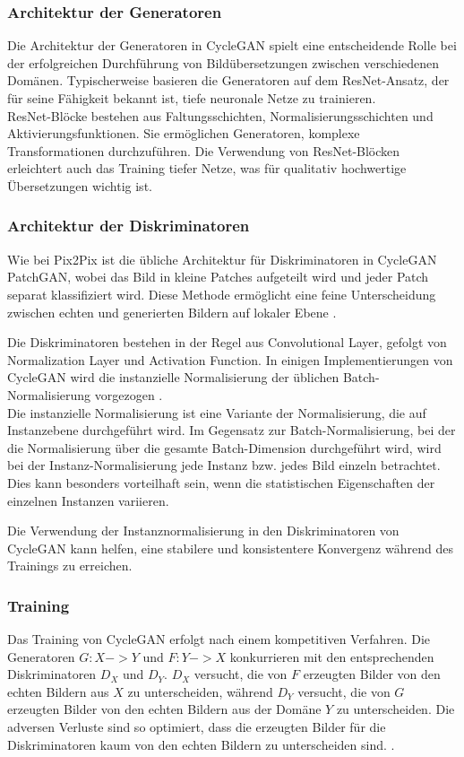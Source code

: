 \subsubsection{Architektur der Generatoren}
Die Architektur der Generatoren in CycleGAN spielt eine entscheidende Rolle bei der erfolgreichen Durchführung von Bildübersetzungen zwischen verschiedenen Domänen. Typischerweise basieren die Generatoren auf dem ResNet-Ansatz, der für seine Fähigkeit bekannt ist, tiefe neuronale Netze zu trainieren.
\\
ResNet-Blöcke bestehen aus Faltungsschichten, Normalisierungsschichten und Aktivierungsfunktionen. Sie ermöglichen Generatoren, komplexe Transformationen durchzuführen. Die Verwendung von ResNet-Blöcken erleichtert auch das Training tiefer Netze, was für qualitativ hochwertige Übersetzungen wichtig ist.

\subsubsection{Architektur der Diskriminatoren}
Wie bei Pix2Pix ist die übliche Architektur für Diskriminatoren in CycleGAN PatchGAN, wobei das Bild in kleine Patches aufgeteilt wird und jeder Patch separat klassifiziert wird. Diese Methode ermöglicht eine feine Unterscheidung zwischen echten und generierten Bildern auf lokaler Ebene \cite{Zhu.2017}.

Die Diskriminatoren bestehen in der Regel aus Convolutional Layer, gefolgt von Normalization Layer und Activation Function. In einigen Implementierungen von CycleGAN wird die instanzielle Normalisierung der üblichen Batch-Normalisierung vorgezogen \cite{}.
\\
Die instanzielle Normalisierung ist eine Variante der Normalisierung, die auf Instanzebene durchgeführt wird. Im Gegensatz zur Batch-Normalisierung, bei der die Normalisierung über die gesamte Batch-Dimension durchgeführt wird, wird bei der Instanz-Normalisierung jede Instanz bzw. jedes Bild einzeln betrachtet. Dies kann besonders vorteilhaft sein, wenn die statistischen Eigenschaften der einzelnen Instanzen variieren.

Die Verwendung der Instanznormalisierung in den Diskriminatoren von CycleGAN kann helfen, eine stabilere und konsistentere Konvergenz während des Trainings zu erreichen.

\subsubsection{Training}
Das Training von CycleGAN erfolgt nach einem kompetitiven Verfahren. Die Generatoren $G:X->Y$ und $F:Y->X$ konkurrieren mit den entsprechenden Diskriminatoren $D_X$ und $D_Y$. $D_X$ versucht, die von $F$ erzeugten Bilder von den echten Bildern aus $X$ zu unterscheiden, während $D_Y$ versucht, die von $G$ erzeugten Bilder von den echten Bildern aus der Domäne $Y$ zu unterscheiden. Die adversen Verluste sind so optimiert, dass die erzeugten Bilder für die Diskriminatoren kaum von den echten Bildern zu unterscheiden sind. \cite{Zhu.2017}.

